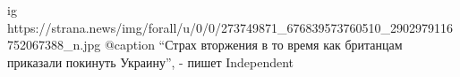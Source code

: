  
 
 
 
 

\ifcmt
  ig https://strana.news/img/forall/u/0/0/273749871_676839573760510_2902979116752067388_n.jpg
  @caption \enquote{Страх вторжения в то время как британцам приказали покинуть Украину}, - пишет Independent 
\fi
